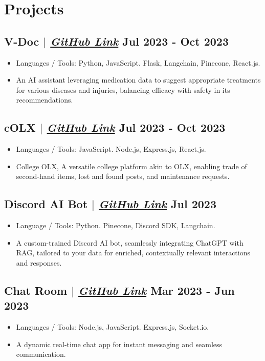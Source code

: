 \documentclass[11pt]{article}
\begin{document}
{{{\section{Projects}

\subsection{V-Doc {\normalfont $|$ \href{https://github.com/adarshkumar714/V-Doc}{\textit{GitHub Link}}} \hfill Jul 2023 - Oct 2023}
\begin{itemize}
    \item Languages / Tools: Python, JavaScript. Flask, Langchain, Pinecone, React.js.
    \item An AI assistant leveraging medication data to suggest appropriate treatments for various diseases and injuries, balancing efficacy with safety in its recommendations.
\end{itemize}

\subsection{cOLX {\normalfont $|$ \href{https://github.com/adarshkumar714/colx}{\textit{GitHub Link}}} \hfill Jul 2023 - Oct 2023}
\begin{itemize}
    \item Languages / Tools: JavaScript. Node.js, Express.js, React.js.
    \item College OLX, A versatile college platform akin to OLX, enabling trade of second-hand items, lost and found posts, and maintenance requests.
\end{itemize}

\subsection{Discord AI Bot {\normalfont $|$ \href{https://github.com/adarshkumar714/Discord-AI-Bot}{\textit{GitHub Link}}} \hfill Jul 2023}
\begin{itemize}
    \item Language / Tools: Python. Pinecone, Discord SDK, Langchain.
    \item A custom-trained Discord AI bot, seamlessly integrating ChatGPT with RAG, tailored to your data for enriched, contextually relevant interactions and responses.
\end{itemize}

\subsection{Chat Room {\normalfont $|$ \href{https://github.com/adarshkumar714/chat-room}{\textit{GitHub Link}}} \hfill Mar 2023 - Jun 2023}
\begin{itemize}
    \item Languages / Tools: Node.js, JavaScript. Express.js, Socket.io.
    \item A dynamic real-time chat app for instant messaging and seamless communication.
\end{itemize}

}}}
\end{document}
